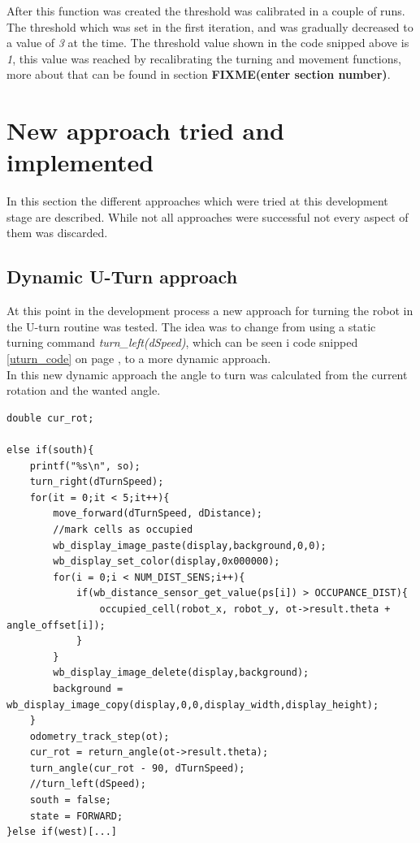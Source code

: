 After this function was created the threshold was calibrated in a couple of runs. The threshold which was set in the first iteration, and was gradually decreased to a value of \textit{3} at the time. The threshold value shown in the code snipped above is \textit{1}, this value was reached by recalibrating the turning and movement functions, more about that can be found in section \textbf{FIXME(enter section number)}.

\section{New approach tried and implemented}
In this section the different approaches which were tried at this development stage are described. While not all approaches were successful not every aspect of them was discarded.

\subsection{Dynamic U-Turn approach}
At this point in the development process a new approach for turning the robot in the U-turn routine was tested. The idea was to change from using a static turning command \textit{turn\_left(dSpeed)}, which can be seen i code snipped \ref{uturn_code} on page \pageref{uturn_code}, to a more dynamic approach. \\
In this new dynamic approach the angle to turn was calculated from the current rotation and the wanted angle.

\begin{lstlisting}[caption={Code snipped of the new approach}, label={newApproach}]
double cur_rot;
	
else if(south){
	printf("%s\n", so);
	turn_right(dTurnSpeed);
	for(it = 0;it < 5;it++){
		move_forward(dTurnSpeed, dDistance);
		//mark cells as occupied
		wb_display_image_paste(display,background,0,0);
		wb_display_set_color(display,0x000000);
		for(i = 0;i < NUM_DIST_SENS;i++){
			if(wb_distance_sensor_get_value(ps[i]) > OCCUPANCE_DIST){
				occupied_cell(robot_x, robot_y, ot->result.theta + angle_offset[i]);
			}
		}
		wb_display_image_delete(display,background);
		background = wb_display_image_copy(display,0,0,display_width,display_height);
	}
	odometry_track_step(ot);
	cur_rot = return_angle(ot->result.theta);
	turn_angle(cur_rot - 90, dTurnSpeed);
	//turn_left(dSpeed);
	south = false;
	state = FORWARD;
}else if(west)[...]
\end{lstlisting}


